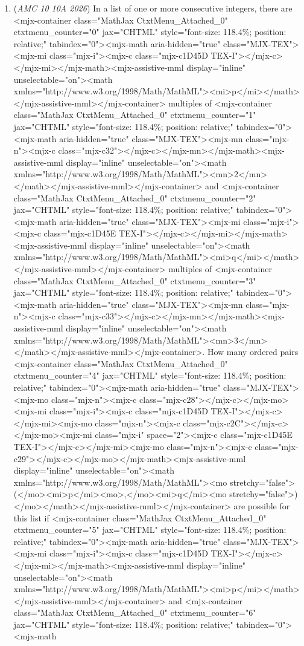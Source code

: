 \begin{enumerate}
	\item (\textit{AMC 10 10A 2026}) In a list of one or more consecutive integers, there are <mjx-container class="MathJax CtxtMenu\_Attached\_0" ctxtmenu\_counter="0" jax="CHTML" style="font-size: 118.4\%; position: relative;" tabindex="0"><mjx-math aria-hidden="true" class="MJX-TEX"><mjx-mi class="mjx-i"><mjx-c class="mjx-c1D45D TEX-I"></mjx-c></mjx-mi></mjx-math><mjx-assistive-mml display="inline" unselectable="on"><math xmlns="http://www.w3.org/1998/Math/MathML"><mi>p</mi></math></mjx-assistive-mml></mjx-container> multiples of <mjx-container class="MathJax CtxtMenu\_Attached\_0" ctxtmenu\_counter="1" jax="CHTML" style="font-size: 118.4\%; position: relative;" tabindex="0"><mjx-math aria-hidden="true" class="MJX-TEX"><mjx-mn class="mjx-n"><mjx-c class="mjx-c32"></mjx-c></mjx-mn></mjx-math><mjx-assistive-mml display="inline" unselectable="on"><math xmlns="http://www.w3.org/1998/Math/MathML"><mn>2</mn></math></mjx-assistive-mml></mjx-container> and <mjx-container class="MathJax CtxtMenu\_Attached\_0" ctxtmenu\_counter="2" jax="CHTML" style="font-size: 118.4\%; position: relative;" tabindex="0"><mjx-math aria-hidden="true" class="MJX-TEX"><mjx-mi class="mjx-i"><mjx-c class="mjx-c1D45E TEX-I"></mjx-c></mjx-mi></mjx-math><mjx-assistive-mml display="inline" unselectable="on"><math xmlns="http://www.w3.org/1998/Math/MathML"><mi>q</mi></math></mjx-assistive-mml></mjx-container> multiples of <mjx-container class="MathJax CtxtMenu\_Attached\_0" ctxtmenu\_counter="3" jax="CHTML" style="font-size: 118.4\%; position: relative;" tabindex="0"><mjx-math aria-hidden="true" class="MJX-TEX"><mjx-mn class="mjx-n"><mjx-c class="mjx-c33"></mjx-c></mjx-mn></mjx-math><mjx-assistive-mml display="inline" unselectable="on"><math xmlns="http://www.w3.org/1998/Math/MathML"><mn>3</mn></math></mjx-assistive-mml></mjx-container>. How many ordered pairs <mjx-container class="MathJax CtxtMenu\_Attached\_0" ctxtmenu\_counter="4" jax="CHTML" style="font-size: 118.4\%; position: relative;" tabindex="0"><mjx-math aria-hidden="true" class="MJX-TEX"><mjx-mo class="mjx-n"><mjx-c class="mjx-c28"></mjx-c></mjx-mo><mjx-mi class="mjx-i"><mjx-c class="mjx-c1D45D TEX-I"></mjx-c></mjx-mi><mjx-mo class="mjx-n"><mjx-c class="mjx-c2C"></mjx-c></mjx-mo><mjx-mi class="mjx-i" space="2"><mjx-c class="mjx-c1D45E TEX-I"></mjx-c></mjx-mi><mjx-mo class="mjx-n"><mjx-c class="mjx-c29"></mjx-c></mjx-mo></mjx-math><mjx-assistive-mml display="inline" unselectable="on"><math xmlns="http://www.w3.org/1998/Math/MathML"><mo stretchy="false">(</mo><mi>p</mi><mo>,</mo><mi>q</mi><mo stretchy="false">)</mo></math></mjx-assistive-mml></mjx-container> are possible for this list if <mjx-container class="MathJax CtxtMenu\_Attached\_0" ctxtmenu\_counter="5" jax="CHTML" style="font-size: 118.4\%; position: relative;" tabindex="0"><mjx-math aria-hidden="true" class="MJX-TEX"><mjx-mi class="mjx-i"><mjx-c class="mjx-c1D45D TEX-I"></mjx-c></mjx-mi></mjx-math><mjx-assistive-mml display="inline" unselectable="on"><math xmlns="http://www.w3.org/1998/Math/MathML"><mi>p</mi></math></mjx-assistive-mml></mjx-container> and <mjx-container class="MathJax CtxtMenu\_Attached\_0" ctxtmenu\_counter="6" jax="CHTML" style="font-size: 118.4\%; position: relative;" tabindex="0"><mjx-math 
\end{enumerate}
